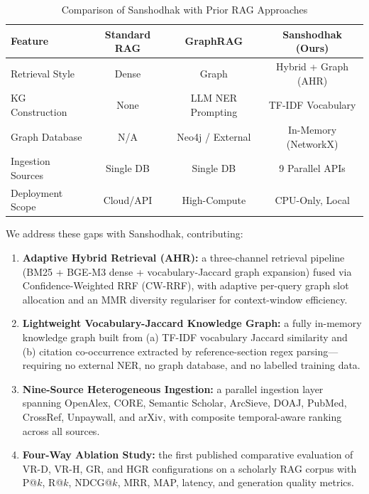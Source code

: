 \documentclass[journal]{IEEEtran}
\begin{document}
\begin{table}[htbp]
\centering
\caption{Comparison of Sanshodhak with Prior RAG Approaches}
\label{tab:comparison}
\begin{tabular}{@{}lccc@{}}
\toprule
\textbf{Feature} & \textbf{Standard RAG} & \textbf{GraphRAG} & \textbf{Sanshodhak (Ours)} \\ \midrule
Retrieval Style & Dense & Graph & Hybrid + Graph (AHR) \\
KG Construction & None & LLM NER Prompting & TF-IDF Vocabulary \\
Graph Database & N/A & Neo4j / External & In-Memory (NetworkX) \\
Ingestion Sources & Single DB & Single DB & 9 Parallel APIs \\
Deployment Scope & Cloud/API & High-Compute & CPU-Only, Local \\ \bottomrule
\end{tabular}
\end{table}

We address these gaps with Sanshodhak, contributing:

\begin{enumerate}[leftmargin=1.5em,itemsep=2pt]
  \item \textbf{Adaptive Hybrid Retrieval (AHR):} a three-channel
    retrieval pipeline (BM25 + BGE-M3 dense + vocabulary-Jaccard
    graph expansion) fused via Confidence-Weighted RRF (CW-RRF),
    with adaptive per-query graph slot allocation and an MMR
    diversity regulariser for context-window efficiency.
  \item \textbf{Lightweight Vocabulary-Jaccard Knowledge Graph:} a
    fully in-memory knowledge graph built from (a) TF-IDF
    vocabulary Jaccard similarity and (b) citation co-occurrence
    extracted by reference-section regex parsing—requiring no external
    NER, no graph database, and no labelled training data.
  \item \textbf{Nine-Source Heterogeneous Ingestion:} a parallel
    ingestion layer spanning OpenAlex, CORE, Semantic Scholar,
    ArcSieve, DOAJ, PubMed, CrossRef, Unpaywall, and arXiv, with
    composite temporal-aware ranking across all sources.
  \item \textbf{Four-Way Ablation Study:} the first published
    comparative evaluation of VR-D, VR-H, GR, and HGR
    configurations on a scholarly RAG corpus with P@$k$, R@$k$,
    NDCG@$k$, MRR, MAP, latency, and generation quality metrics.
\end{enumerate}
\end{document}
